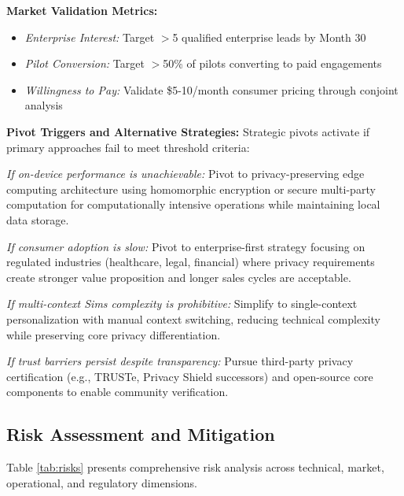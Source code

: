 \documentclass[11pt]{article}
\begin{document}
\textbf{Market Validation Metrics:}
\begin{itemize}[noitemsep]
    \item \textit{Enterprise Interest:} Target $>$5 qualified enterprise leads by Month 30
    \item \textit{Pilot Conversion:} Target $>$50\% of pilots converting to paid engagements
    \item \textit{Willingness to Pay:} Validate \$5-10/month consumer pricing through conjoint analysis
\end{itemize}

\textbf{Pivot Triggers and Alternative Strategies:}
Strategic pivots activate if primary approaches fail to meet threshold criteria:

\textit{If on-device performance is unachievable:} Pivot to privacy-preserving edge computing architecture using homomorphic encryption or secure multi-party computation for computationally intensive operations while maintaining local data storage.

\textit{If consumer adoption is slow:} Pivot to enterprise-first strategy focusing on regulated industries (healthcare, legal, financial) where privacy requirements create stronger value proposition and longer sales cycles are acceptable.

\textit{If multi-context Sims complexity is prohibitive:} Simplify to single-context personalization with manual context switching, reducing technical complexity while preserving core privacy differentiation.

\textit{If trust barriers persist despite transparency:} Pursue third-party privacy certification (e.g., TRUSTe, Privacy Shield successors) and open-source core components to enable community verification.

\vspace*{-8pt}
\subsection{Risk Assessment and Mitigation}
\vspace*{-8pt}
Table \ref{tab:risks} presents comprehensive risk analysis across technical, market, operational, and regulatory dimensions.
\end{document}
